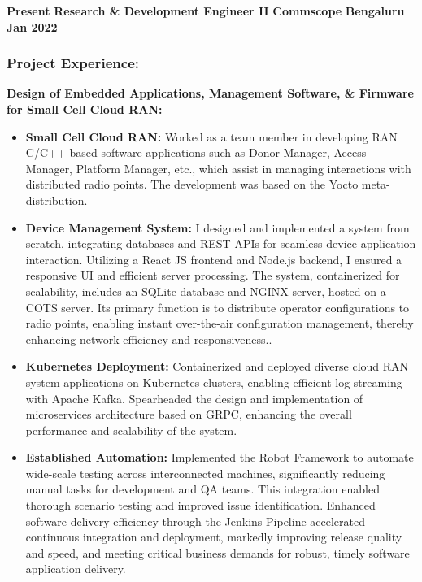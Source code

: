 %
%
 \setlength{\parskip}{10pt plus 1pt minus 1pt}

\begin{experiences}
    \small
    \experience
        {\textbf{Present}}   %
        {\textbf{Research \& Development Engineer II}}  %
        {\textbf{Commscope}}  %
        {\textbf{Bengaluru}}  %
        {   %
            \textbf{Jan 2022}  %
        }
        {   %
            \subsubsection*{\textbf{Project Experience:}}
            \textbf{Design of Embedded Applications, Management Software, \& Firmware for Small Cell Cloud RAN:}
            \begin{itemize}
                \item \textbf{Small Cell Cloud RAN:} Worked as a team member in developing RAN C/C++ based software applications such as Donor Manager, Access Manager, Platform Manager, etc., which assist in managing interactions with distributed radio points. The development was based on the Yocto meta-distribution.
                \item \textbf{Device Management System:} I designed and implemented a system from scratch, integrating databases and REST APIs for seamless device application interaction. Utilizing a React JS frontend and Node.js backend, I ensured a responsive UI and efficient server processing. The system, containerized for scalability, includes an SQLite database and NGINX server, hosted on a COTS server. Its primary function is to distribute operator configurations to radio points, enabling instant over-the-air configuration management, thereby enhancing network efficiency and responsiveness..
                \item \textbf{Kubernetes Deployment:} Containerized and deployed diverse cloud RAN system applications on Kubernetes clusters, enabling efficient log streaming with Apache Kafka. Spearheaded the design and implementation of microservices architecture based on GRPC, enhancing the overall performance and scalability of the system.
                \item \textbf{Established Automation:} Implemented the Robot Framework to automate wide-scale testing across interconnected machines, significantly reducing manual tasks for development and QA teams. This integration enabled thorough scenario testing and improved issue identification. Enhanced software delivery efficiency through the Jenkins Pipeline accelerated continuous integration and deployment, markedly improving release quality and speed, and meeting critical business demands for robust, timely software application delivery.

\end{itemize}}
\end{experiences}
